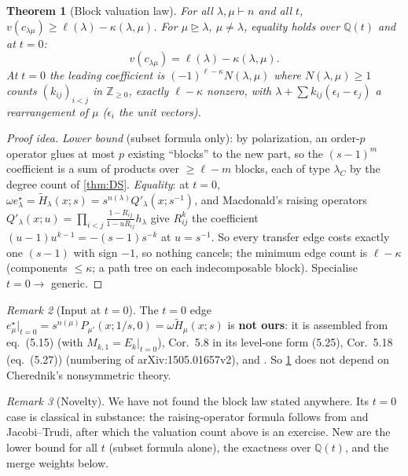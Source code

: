 \documentclass[submission]{FPSAC2027}
\newtheorem{theorem}{Theorem}[section]
\theoremstyle{definition}
\theoremstyle{remark}
\newtheorem{remark}[theorem]{Remark}
\newcommand{\val}{v}
\begin{document}
\begin{theorem}[Block valuation law]\label{thm:blocklaw}
For all $\lambda,\mu\vdash n$ and all $t$, $\val(c_{\lambda\mu})\ge\ell(\lambda)-\kappa(\lambda,\mu)$. For $\mu\trianglerighteq\lambda$, $\mu\neq\lambda$, equality holds over $\mathbb{Q}(t)$ and at $t=0$:
\[ \val(c_{\lambda\mu})=\ell(\lambda)-\kappa(\lambda,\mu). \]
At $t=0$ the leading coefficient is $(-1)^{\ell-\kappa}N(\lambda,\mu)$ where $N(\lambda,\mu)\ge1$ counts $(k_{ij})_{i<j}$ in $\mathbb{Z}_{\ge0}$, exactly $\ell-\kappa$ nonzero, with $\lambda+\sum k_{ij}(\epsilon_i-\epsilon_j)$ a rearrangement of $\mu$ ($\epsilon_i$ the unit vectors).
\end{theorem}
\begin{proof}[Proof idea]
\emph{Lower bound} (subset formula only): by polarization, an order-$p$ operator glues at most $p$ existing ``blocks'' to the new part, so the $(s-1)^m$ coefficient is a sum of products over $\ge\ell-m$ blocks, each of type $\lambda_C$ by the degree count of \cref{thm:DS}. \emph{Equality}: at $t=0$, $\omega e^\star_\lambda=\widetilde H_\lambda(x;s)=s^{n(\lambda)}Q'_\lambda(x;s^{-1})$, and Macdonald's raising operators $Q'_\lambda(x;u)=\prod_{i<j}\frac{1-R_{ij}}{1-uR_{ij}}h_\lambda$ \cite[III (2.15$'$) with \S5 Ex.~7(a)]{Macdonald95} give $R_{ij}^k$ the coefficient $(u-1)u^{k-1}=-(s-1)s^{-k}$ at $u=s^{-1}$. So every transfer edge costs exactly one $(s-1)$ with sign $-1$, so nothing cancels; the minimum edge count is $\ell-\kappa$ (components $\le\kappa$; a path tree on each indecomposable block). Specialise $t=0\to$ generic.
\end{proof}
\begin{remark}[Input at $t=0$]\label{rem:t0input}
The $t=0$ edge $e^\star_\mu|_{t=0}=s^{n(\mu)}P_{\mu'}(x;1/s,0)=\omega\widetilde H_\mu(x;s)$ is \textbf{not ours}: it is assembled from \cite{DFK18} eq.~(5.15) (with $M_{k,1}=E_k|_{t=0}$), Cor.~5.8 in its level-one form (5.25), Cor.~5.18 (eq.~(5.27)) (numbering of arXiv:1505.01657v2), and \cite[VI (5.1), (4.14)(iv)]{Macdonald95}. So \cref{thm:blocklaw} does not depend on Cherednik's nonsymmetric theory.
\end{remark}
\begin{remark}[Novelty]
We have not found the block law stated anywhere. Its $t=0$ case is classical in substance: the raising-operator formula follows from \cite[eq.~(11)]{DLT94} and Jacobi--Trudi, after which the valuation count above is an exercise. New are the lower bound for all $t$ (subset formula alone), the exactness over $\mathbb{Q}(t)$, and the merge weights below.
\end{remark}
\end{document}
